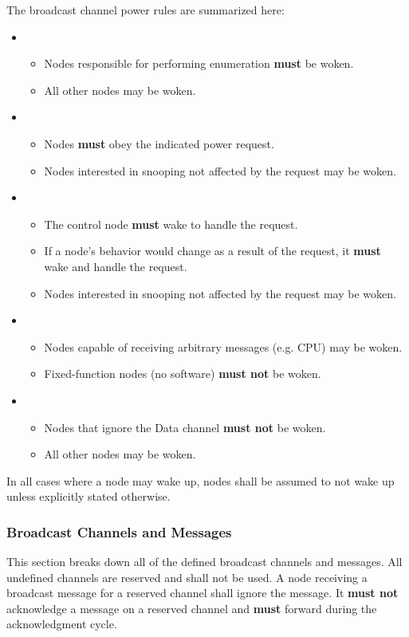 \medskip\noindent
The \bus broadcast channel power rules are summarized here:
\begin{itemize}
  \item {}
  \begin{itemize}
    \item Nodes responsible for performing enumeration {\bf must} be woken.
    \item All other nodes may be woken.
  \end{itemize}
  \item {}
  \begin{itemize}
    \item Nodes {\bf must} obey the indicated power request.
    \item Nodes interested in snooping not affected by the request may be woken.
  \end{itemize}
  \item {}
  \begin{itemize}
    \item The control node {\bf must} wake to handle the request.
    \item If a node's behavior would change as a result of the request, it
          {\bf must} wake and handle the request.
    \item Nodes interested in snooping not affected by the request may be woken.
  \end{itemize}
  \item {}
  \begin{itemize}
    \item Nodes capable of receiving arbitrary messages (e.g. CPU) may be
             woken.
    \item Fixed-function nodes (no software) {\bf must not} be woken.
  \end{itemize}
  \item {}
  \begin{itemize}
    \item Nodes that ignore the Data channel {\bf must not} be woken.
    \item All other nodes may be woken.
  \end{itemize}
\end{itemize}
%
In all cases where a node may wake up, nodes shall be assumed to not wake up
unless explicitly stated otherwise.

\subsubsection{Broadcast Channels and Messages}
This section breaks down all of the defined \bus broadcast channels and messages.
All undefined channels are reserved and shall not be used. A node receiving a
broadcast message for a reserved channel shall ignore the message. It {\bf
must not} acknowledge a message on a reserved channel and {\bf must} forward
during the acknowledgment cycle.

